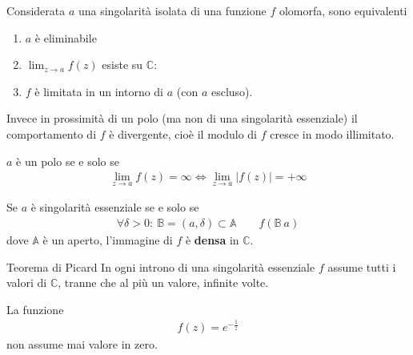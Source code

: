 \documentclass[a4paper, oneside]{article}
\begin{document}
\begin{theorem}
    Considerata $a$ una singolarità isolata di una funzione $f$ olomorfa, sono equivalenti
    \begin{enumerate}
        \item $a$ è eliminabile
        \item $\lim_{z \to a} f(z)$ esiste su $\mathbb{C}$:
        \item $f$ è limitata in un intorno di $a$ (con $a$ escluso). 
    \end{enumerate}
    Invece in prossimità di un polo (ma non di una singolarità essenziale) il comportamento di
$f$ è divergente, cioè il modulo di $f$ cresce in modo illimitato.
\end{theorem}

\begin{theorem}
    $a$ è un polo se e solo se
    \begin{align}
        \lim_{z \to a} f(z) = \infty \Longleftrightarrow \lim_{z \to a} \left| f(z) \right| = +\infty 
    \end{align}
\end{theorem}

\begin{theorem}
    Se $a$ è singolarità essenziale se e solo se 
    \begin{align}
        \forall \delta > 0 : \ \mathbb{B} = (a, \delta) \subset \mathbb{A} \qquad f(\mathbb{B} \ {a})
    \end{align}
    dove $\mathbb{A}$ è un aperto, l'immagine di $f$ è \textbf{densa} in $\mathbb{C}$.
\end{theorem}

\begin{theorem}{Teorema di Picard}
    In ogni introno di una singolarità essenziale  $f$ assume tutti i valori
    di $\mathbb{C}$, tranne che al più un valore, infinite volte.   
\end{theorem}

\begin{example}
    La funzione 
    \begin{gather*}
        f(z) = e^{-\frac{1}{z}}
    \end{gather*}
    non assume mai valore in zero. 
\end{example}
\end{document}
